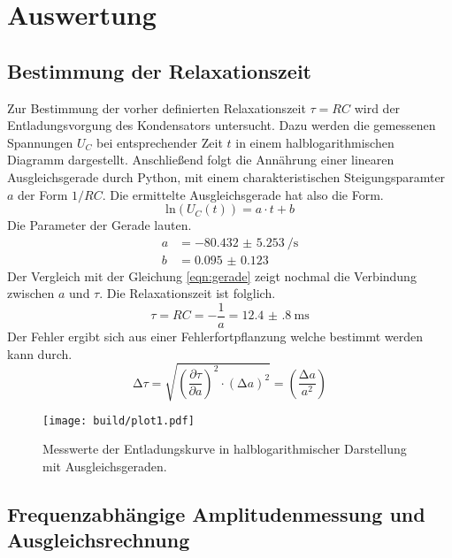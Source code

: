 \section{Auswertung}
\subsection{Bestimmung der Relaxationszeit}  %
Zur Bestimmung der vorher definierten Relaxationszeit $\tau = RC$ wird der Entladungsvorgung des Kondensators untersucht.
Dazu werden die gemessenen Spannungen $U_{C}$ bei entsprechender Zeit $t$ in einem halblogarithmischen Diagramm dargestellt.
Anschließend folgt die Annährung einer linearen Ausgleichsgerade durch Python, mit einem charakteristischen Steigungsparamter $a$
der Form $1/RC$. 
Die ermittelte Ausgleichsgerade hat also die Form.
\begin{equation}
    \text{ln}(U_{C}(t)) = a \cdot t + b
\end{equation}
Die Parameter der Gerade lauten.
 \begin{align*}
     a &= \SI{-80.432(5253)}{\si{\per\second}} \\
     b &= \SI{0.095(0123)}{}
 \end{align*}
Der Vergleich mit der Gleichung \eqref{eqn:gerade} zeigt nochmal die Verbindung zwischen $a$ und $\tau$. Die Relaxationszeit ist folglich.
\begin{equation}
\tau = RC = - \frac{1}{a} = \SI{12.4(8)}{\milli\second}
\end{equation}
Der Fehler ergibt sich aus einer Fehlerfortpflanzung welche bestimmt werden kann durch.
\begin{equation}
\increment \tau = \sqrt{\left( \frac{\partial \tau}{\partial a}\right)^{2} \cdot (\increment a)^{2}} = \left( \frac{\increment a}{a^{2}}\right) 
\end{equation}
\begin{figure}
    \centering 
    \texttt{[image: build/plot1.pdf]}
    \caption{Messwerte der Entladungskurve in halblogarithmischer Darstellung mit Ausgleichsgeraden.}
    \label{plt:plot1}
\end{figure} 

\subsection{Frequenzabhängige Amplitudenmessung und Ausgleichsrechnung}

